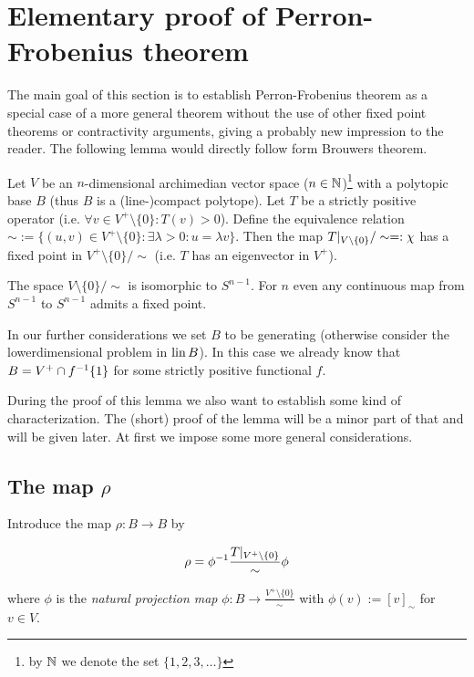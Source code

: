 \documentclass{article}
\begin{document}
\section{Elementary proof of Perron-Frobenius theorem}

The main goal of this section is to establish Perron-Frobenius theorem as a special case of a more general theorem without the use of other fixed point theorems or contractivity arguments, giving a probably new impression to the reader.
The following lemma would directly follow form Brouwers theorem.

\begin{lemma}\label{lem1}
Let $V$ be an $n$-dimensional archimedian vector space ($n\in\mathbb{N}$)\footnote{by $\mathbb{N}$ we denote the set $\{1,2,3,\ldots\}$} with a polytopic base $B$ (thus $B$ is a (line-)compact polytope). Let $T$ be a strictly positive operator (i.e. $\forall v\in V^+\setminus\{0\}:T(v)>0$). Define the equivalence relation $\sim:=\{(u,v)\in V^+\setminus\{0\}:\exists \lambda>0:u=\lambda v\}$. Then the map $T\vert_{V\setminus\{0\}}/\sim=:\chi$ has a fixed point in $V^+\setminus\{0\}/\sim$ (i.e. $T$ has an eigenvector in $V^+$).  
\end{lemma}

\begin{remark}
The space $V\setminus\{0\}/\sim$ is isomorphic to $S^{n-1}$. For $n$ even any continuous map from $S^{n-1}$ to $S^{n-1}$ admits a fixed point. 
\end{remark}

\begin{remark}
In our further considerations we set $B$ to be generating (otherwise consider the lowerdimensional problem in $\operatorname{lin} B$). In this case we already know that $B=V^+\cap f^{-1}\{1\}$ for some strictly positive functional $f$.
\end{remark}

During the proof of this lemma we also want to establish some kind of characterization.
The (short) proof of the lemma will be a minor part of that and will be given later. At first we impose some more general considerations.

\subsection{The map $\rho$}

\begin{definition}
Introduce the map $\rho:B\to B$ by

\begin{equation}
\rho=\phi^{-1}\frac{T\vert_{V^+\setminus\{0\}}}{\sim}\phi
\end{equation}

where $\phi$ is the \emph{natural projection map} $\phi:B\to\frac{V^+\setminus\{0\}}{\sim}$ with $\phi(v):=[v]_\sim$ for $v\in V$.
\end{definition}
\end{document}
